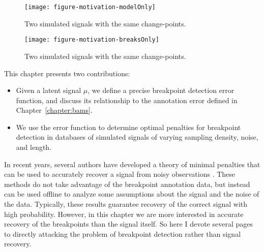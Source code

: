 \documentclass{jsfds} %
\begin{document}
\begin{figure}
  \centering
  \texttt{[image: figure-motivation-modelOnly]}
  \caption{Two simulated signals with the same change-points.}
  \label{fig:motivation}
\end{figure}

\begin{figure}
  \centering
  \texttt{[image: figure-motivation-breaksOnly]}
  \caption{Two simulated signals with the same change-points.}
  \label{fig:motivation}
\end{figure}



This chapter presents two contributions:
\begin{itemize}
\item Given a latent signal $\mu$, we define a precise breakpoint
  detection error function, and discuss its relationship to the
  annotation error defined in Chapter~\ref{chapter:bams}.
\item We use the error function to determine optimal penalties for
  breakpoint detection in databases of simulated signals of varying
  sampling density, noise, and length.
\end{itemize}

In recent years, several authors have developed a theory of minimal
penalties that can be used to accurately recover a signal from noisy
observations \citep{calibration,lebarbier}. These methods do not take
advantage of the breakpoint annotation data, but instead can be used
offline to analyze some assumptions about the signal and the noise of
the data. Typically, these results guarantee recovery of the correct
signal with high probability. However, in this chapter we are more
interested in accurate recovery of the breakpoints than the signal
itself.
So here I devote several
pages to directly attacking the problem of breakpoint detection rather
than signal recovery.

\end{document}
